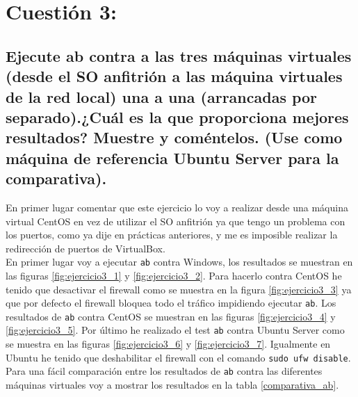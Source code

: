 
\section{Cuestión 3:}

\subsection{Ejecute ab contra a las tres máquinas virtuales (desde el SO anfitrión a las máquina virtuales de la red local) una a una (arrancadas por separado).¿Cuál es la que proporciona mejores resultados? Muestre y coméntelos. (Use como máquina de referencia Ubuntu Server para la comparativa).}

En primer lugar comentar que este ejercicio lo voy a realizar desde una máquina virtual CentOS en vez de utilizar el SO anfitrión ya que tengo un problema con los puertos, como ya dije en prácticas anteriores, y me es imposible realizar la redirección de puertos de VirtualBox.\\

En primer lugar voy a ejecutar \texttt{ab} contra Windows, los resultados se muestran en las figuras \ref{fig:ejercicio3_1} y \ref{fig:ejercicio3_2}. Para hacerlo contra CentOS he tenido que desactivar el firewall como se muestra en la figura \ref{fig:ejercicio3_3} ya que por defecto el firewall bloquea todo el tráfico impidiendo ejecutar \texttt{ab}. Los resultados de \texttt{ab} contra CentOS se muestran en las figuras \ref{fig:ejercicio3_4} y \ref{fig:ejercicio3_5}. Por último he realizado el test \texttt{ab} contra Ubuntu Server como se muestra en las figuras \ref{fig:ejercicio3_6} y \ref{fig:ejercicio3_7}. Igualmente en Ubuntu he tenido que deshabilitar el firewall con el comando \texttt{sudo ufw disable}.\\

Para una fácil comparación entre los resultados de \texttt{ab} contra las diferentes máquinas virtuales voy a mostrar los resultados en la tabla \ref{comparativa_ab}.

